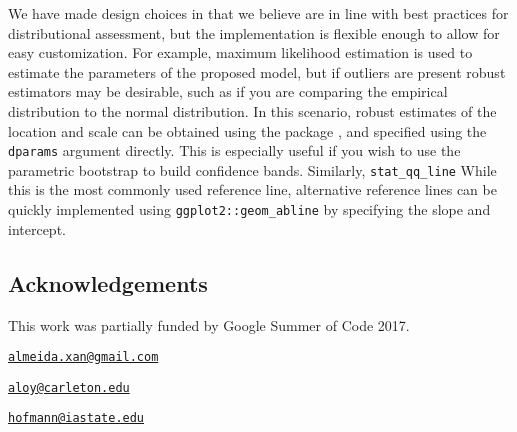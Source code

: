 We have made design choices in  that we believe are in line
with best practices for distributional assessment, but the
implementation is flexible enough to allow for easy customization. For
example, maximum likelihood estimation is used to estimate the
parameters of the proposed model, but if outliers are present robust
estimators may be desirable, such as if you are comparing the empirical
distribution to the normal distribution. In this scenario, robust
estimates of the location and scale can be obtained using the
 package \citep{robustbase}, and specified using the
\texttt{dparams} argument directly. This is especially useful if you
wish to use the parametric bootstrap to build confidence bands.
Similarly, \texttt{stat\_qq\_line}
While this is the most commonly used reference line, alternative
reference lines
 can be quickly
implemented using \texttt{ggplot2::geom\_abline} by specifying the slope
and intercept.



\subsection{Acknowledgements}\label{acknowledgements}

This work was partially funded by Google Summer of Code 2017.

\address{%
Alexandre Almeida\\
University of Campinas\\
Institute of Computing\\ Campinas, Brazil 13083-852\\
}
\href{mailto:almeida.xan@gmail.com}{\nolinkurl{almeida.xan@gmail.com}}

\address{%
Adam Loy\\
Carleton College\\
Department of Mathematics and Statistics\\ Northfield, MN 55057\\
}
\href{mailto:aloy@carleton.edu}{\nolinkurl{aloy@carleton.edu}}

\address{%
Heike Hofmann\\
Iowa State University\\
Department of Statistics\\ Ames, IA 50011-1210\\
}
\href{mailto:hofmann@iastate.edu}{\nolinkurl{hofmann@iastate.edu}}

